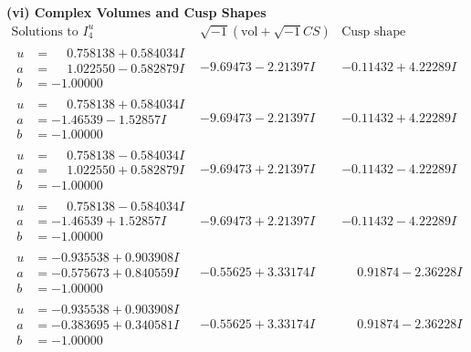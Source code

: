 \documentclass[1p]{elsarticle_modified}
\theoremstyle{definition}
\newcommand{\I}{\sqrt{-1}}
\begin{document}
\newpage\flushleft \textbf{(vi) Complex Volumes and Cusp Shapes}
$$\begin{array}{c|c|c}  
\text{Solutions to }I^u_{4}& \I (\text{vol} + \sqrt{-1}CS) & \text{Cusp shape}\\
 \hline 
\begin{aligned}
u &= \phantom{-}0.758138 + 0.584034 I \\
a &= \phantom{-}1.022550 - 0.582879 I \\
b &= -1.00000\phantom{ +0.000000I}\end{aligned}
 & -9.69473 - 2.21397 I & -0.11432 + 4.22289 I \\ \hline\begin{aligned}
u &= \phantom{-}0.758138 + 0.584034 I \\
a &= -1.46539 - 1.52857 I \\
b &= -1.00000\phantom{ +0.000000I}\end{aligned}
 & -9.69473 - 2.21397 I & -0.11432 + 4.22289 I \\ \hline\begin{aligned}
u &= \phantom{-}0.758138 - 0.584034 I \\
a &= \phantom{-}1.022550 + 0.582879 I \\
b &= -1.00000\phantom{ +0.000000I}\end{aligned}
 & -9.69473 + 2.21397 I & -0.11432 - 4.22289 I \\ \hline\begin{aligned}
u &= \phantom{-}0.758138 - 0.584034 I \\
a &= -1.46539 + 1.52857 I \\
b &= -1.00000\phantom{ +0.000000I}\end{aligned}
 & -9.69473 + 2.21397 I & -0.11432 - 4.22289 I \\ \hline\begin{aligned}
u &= -0.935538 + 0.903908 I \\
a &= -0.575673 + 0.840559 I \\
b &= -1.00000\phantom{ +0.000000I}\end{aligned}
 & -0.55625 + 3.33174 I & \phantom{-}0.91874 - 2.36228 I \\ \hline\begin{aligned}
u &= -0.935538 + 0.903908 I \\
a &= -0.383695 + 0.340581 I \\
b &= -1.00000\phantom{ +0.000000I}\end{aligned}
 & -0.55625 + 3.33174 I & \phantom{-}0.91874 - 2.36228 I \\ \hline\begin{aligned}

\end{aligned}
\end{array}$$
\end{document}

